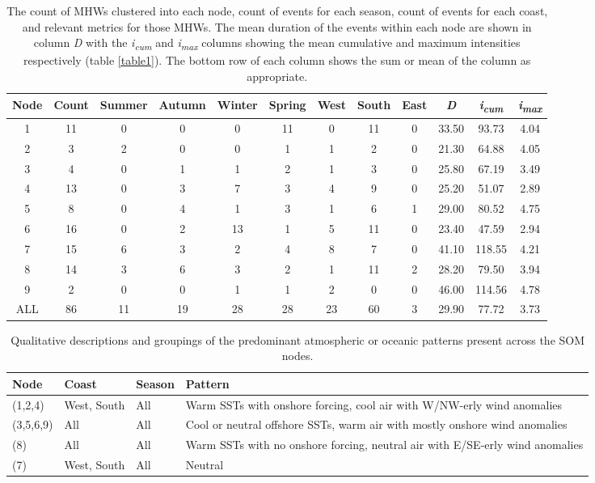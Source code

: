 \documentclass[utf8]{frontiersSCNS}
\begin{document}
\begin{table}[ht]
\caption{The count of MHWs clustered into each node, count of events for each season, count of events for each coast, and relevant metrics for those MHWs. The mean duration of the events within each node are shown in column \emph{D} with the \emph{i\textsubscript{cum}} and \emph{i\textsubscript{max}} columns showing the mean cumulative and maximum intensities respectively (table \ref{table1}). The bottom row of each column shows the sum or mean of the column as appropriate.}
\label{table2}
\centering
\tiny
\begin{tabular}{cccccccccccc}
  \toprule
Node & Count & Summer & Autumn & Winter & Spring & West & South & East & \emph{D} & \emph{i\textsubscript{cum}} & \emph{i\textsubscript{max}} \\
  \midrule
  1 &  11 &   0 &   0 &   0 &  11 &   0 &  11 &   0 & 33.50 & 93.73 & 4.04 \\
  2 &   3 &   2 &   0 &   0 &   1 &   1 &   2 &   0 & 21.30 & 64.88 & 4.05 \\
  3 &   4 &   0 &   1 &   1 &   2 &   1 &   3 &   0 & 25.80 & 67.19 & 3.49 \\
  4 &  13 &   0 &   3 &   7 &   3 &   4 &   9 &   0 & 25.20 & 51.07 & 2.89 \\
  5 &   8 &   0 &   4 &   1 &   3 &   1 &   6 &   1 & 29.00 & 80.52 & 4.75 \\
  6 &  16 &   0 &   2 &  13 &   1 &   5 &  11 &   0 & 23.40 & 47.59 & 2.94 \\
  7 &  15 &   6 &   3 &   2 &   4 &   8 &   7 &   0 & 41.10 & 118.55 & 4.21 \\
  8 &  14 &   3 &   6 &   3 &   2 &   1 &  11 &   2 & 28.20 & 79.50 & 3.94 \\
  9 &   2 &   0 &   0 &   1 &   1 &   2 &   0 &   0 & 46.00 & 114.56 & 4.78 \\
  ALL &  86 &  11 &  19 &  28 &  28 &  23 &  60 &   3 & 29.90 & 77.72 & 3.73 \\
  \bottomrule
  \end{tabular}
\end{table}

\begin{table}[ht]
\caption{Qualitative descriptions and groupings of the predominant atmospheric or oceanic patterns present across the SOM nodes.}
\label{table3}
\centering
\tiny
\begin{tabular}{llll}
  \toprule
Node & Coast & Season & Pattern \\ 
  \midrule
(1,2,4) & West, South & All & Warm SSTs with onshore forcing, cool air with W/NW-erly wind anomalies \\ 
  (3,5,6,9) & All & All & Cool or neutral offshore SSTs, warm air with mostly onshore wind anomalies \\ 
  (8) & All & All & Warm SSTs with no onshore forcing, neutral air with E/SE-erly wind anomalies \\ 
  (7) & West, South & All & Neutral \\ 
  \bottomrule
  \end{tabular}
\end{table}
\end{document}

